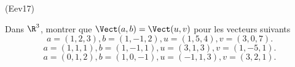 \begin{tiny}(Eev17)\end{tiny} Dans $\R^3$, montrer que $\Vect(a,b)=\Vect(u,v)$ pour les vecteurs suivants
\[
 a=(1,2,3), b=(1,-1,2), u=(1,5,4), v=(3,0,7).
\]
\[
a=(1,1,1), b=(1,-1,1), u=(3,1,3), v=(1,-5,1).  
\]
\[
 a=(0,1,2), b=(1,0,-1), u=(-1,1,3), v=(3,2,1).
\]
 
